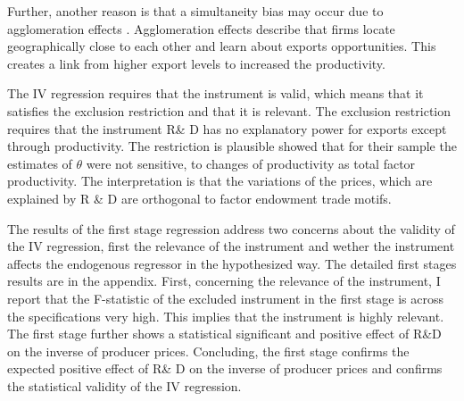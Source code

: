 Further, another reason is that a simultaneity bias may occur due to agglomeration effects \parencite{costinot}. Agglomeration effects describe  that firms locate geographically close to each other and learn about exports opportunities. This creates a link from higher export levels to  increased the productivity.  \par
The IV regression requires that the instrument is valid, which means that it satisfies the exclusion restriction and that it is relevant.  The exclusion restriction requires that the instrument R\& D has no explanatory power for exports except through productivity. The restriction is plausible  \textcite{costinot} showed that for their sample the estimates of $\theta$ were not sensitive, to changes of productivity as total factor productivity. The interpretation is that the variations of the prices, which are explained by R \& D are orthogonal to factor endowment trade motifs.
\par   The results of the first stage regression address two concerns about the validity of the IV regression, first the relevance of the instrument and wether the instrument affects the endogenous regressor in the hypothesized way. The detailed first stages results are in the appendix. First, concerning the relevance of the instrument, I report that  the F-statistic of the excluded instrument in the first stage is across the specifications very high. This implies  that the instrument is highly relevant.  The first stage further shows a statistical significant and positive effect of  R\&D on the inverse of producer prices. Concluding, the first stage confirms the expected positive effect of R\& D on the inverse of producer prices and confirms the statistical validity of the IV regression.   %
